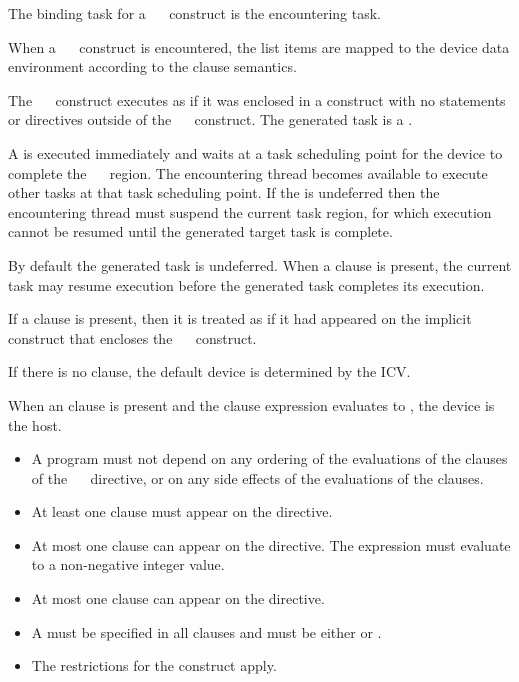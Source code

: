 \binding
The binding task for a ~~ construct is the encountering task. 

\descr
When a ~~ construct is encountered, the list items are mapped to the device data environment according to the  clause semantics.

The ~~ construct executes as if it was enclosed in a  construct with no statements or directives outside of the ~~ construct. The generated task is a .

A  is executed immediately and waits at a task scheduling point for the device to complete the ~~ region. The encountering thread becomes available to execute other tasks at that task scheduling point. If the  is undeferred then the encountering thread must suspend the current task region, for which execution cannot be resumed until the generated target task is complete.

By default the generated task is undeferred. When a  clause is present, the current task may resume execution before the generated task completes its execution.

If a  clause is present, then it is treated as if it had appeared on the implicit  construct that encloses the ~~ construct.

If there is no  clause, the default device is determined by the  ICV.

When an  clause is present and the  clause expression evaluates to , the device is the host. 

\restrictions
\begin{itemize}
\item A program must not depend on any ordering of the evaluations of the clauses of the ~~ directive, or on any side effects of the evaluations of the clauses.
\item At least one  clause must appear on the directive.
\item At most one  clause can appear on the directive. The  expression must evaluate to a non-negative integer value.
\item At most one  clause can appear on the directive.
\item A  must be specified in all  clauses and must be either  or .
\item The restrictions for the  construct apply. 
\end{itemize}

